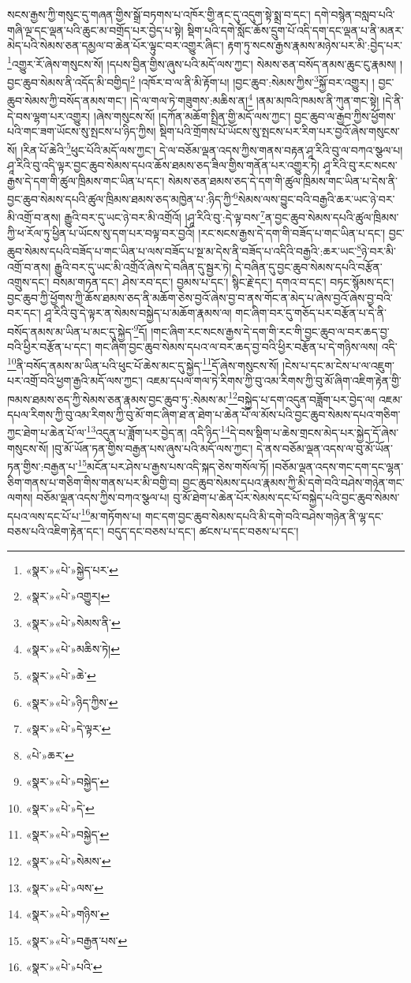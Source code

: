 སངས་རྒྱས་ཀྱི་གསུང་དུ་གཞན་གྱིས་སྒྲོ་བཏགས་པ་འཁོར་གྱི་ནང་དུ་འདུག་སྟེ་སྨྲ་བ་དང་། དགེ་བསྙེན་བསླབ་པའི་གཞི་ལྔ་དང་ལྡན་པའི་ཆུང་མ་བགྲོད་པར་བྱེད་པ་སྟེ། སྡིག་པའི་དགེ་སློང་ཆོས་དྲུག་པོ་འདི་དག་དང་ལྡན་པ་ནི་མནར་མེད་པའི་སེམས་ཅན་དམྱལ་བ་ཆེན་པོར་ལྟུང་བར་འགྱུར་ཞིང་། རྟག་ཏུ་སངས་རྒྱས་རྣམས་མཉེས་པར་མི་:བྱེད་པར་\footnote{«སྣར་»«པེ་»སྐྱེད་པར་}འགྱུར་རོ་ཞེས་གསུངས་སོ། །དཔས་བྱིན་གྱིས་ཞུས་པའི་མདོ་ལས་ཀྱང་། སེམས་ཅན་བསོད་ནམས་ཆུང་ངུ་རྣམས། །བྱང་ཆུབ་སེམས་ནི་འདོད་མི་བགྱིད།\footnote{«སྣར་»«པེ་»འགྱུར།} །འཁོར་བ་ལ་ནི་མི་རྟོག་པ། །བྱང་ཆུབ་:སེམས་ཀྱིས་\footnote{«སྣར་»«པེ་»སེམས་ནི་}སྐྱོ་བར་འགྱུར། །
བྱང་ཆུབ་སེམས་ཀྱི་བསོད་ནམས་གང་། །དེ་ལ་གལ་ཏེ་གཟུགས་:མཆིས་ན།\footnote{«སྣར་»«པེ་»མཆིས་ཏེ།} །ནམ་མཁའི་ཁམས་ནི་ཀུན་གང་སྟེ། །དེ་ནི་དེ་བས་ལྷག་པར་འགྱུར། །ཞེས་གསུངས་སོ། །དཀོན་མཆོག་སྤྲིན་གྱི་མདོ་ལས་ཀྱང་། བྱང་ཆུབ་ལ་རྒྱབ་ཀྱིས་ཕྱོགས་པའི་གང་ཟག་ཡོངས་སུ་སྤངས་པ་ཉིད་ཀྱིས། སྡིག་པའི་གྲོགས་པོ་ཡོངས་སུ་སྤངས་པར་རིག་པར་བྱའོ་ཞེས་གསུངས་སོ། །རིན་པོ་ཆེའི་\footnote{«སྣར་»«པེ་»ཆེ་}ཕུང་པོའི་མདོ་ལས་ཀྱང་། དེ་ལ་བཅོམ་ལྡན་འདས་ཀྱིས་གནས་བརྟན་ཤཱ་རིའི་བུ་ལ་བཀའ་སྩལ་པ། ཤཱ་རིའི་བུ་འདི་ལྟར་བྱང་ཆུབ་སེམས་དཔའ་ཆོས་ཐམས་ཅད་ཟིལ་གྱིས་གནོན་པར་འགྱུར་ཏེ། ཤཱ་རིའི་བུ་རང་སངས་རྒྱས་དེ་དག་གི་ཚུལ་ཁྲིམས་གང་ཡིན་པ་དང་། སེམས་ཅན་ཐམས་ཅད་དེ་དག་གི་ཚུལ་ཁྲིམས་གང་ཡིན་པ་དེས་ནི་བྱང་ཆུབ་སེམས་དཔའི་ཚུལ་ཁྲིམས་ཐམས་ཅད་མཁྱེན་པ་:ཉིད་ཀྱི་\footnote{«སྣར་»«པེ་»ཉིད་ཀྱིས་}སེམས་ལས་བྱུང་བའི་བརྒྱའི་ཆར་ཡང་ཉེ་བར་མི་འགྲོ་བ་ནས། རྒྱུའི་བར་དུ་ཡང་ཉེ་བར་མི་འགྲོའོ། །ཤཱ་རིའི་བུ་:དེ་ལྟ་བས་\footnote{«སྣར་»«པེ་»དེ་ལྟར་}ན་བྱང་ཆུབ་སེམས་དཔའི་ཚུལ་ཁྲིམས་ཀྱི་ཕ་རོལ་ཏུ་ཕྱིན་པ་ཡོངས་སུ་དག་པར་བལྟ་བར་བྱའོ། །རང་སངས་རྒྱས་དེ་དག་གི་བཟོད་པ་གང་ཡིན་པ་དང་། བྱང་ཆུབ་སེམས་དཔའི་བཟོད་པ་གང་ཡིན་པ་ལས་བཟོད་པ་སྔ་མ་དེས་ནི་བཟོད་པ་འདིའི་བརྒྱའི་:ཆར་ཡང་\footnote{«པེ་»ཆར་}ཉེ་བར་མི་འགྲོ་བ་ནས། རྒྱུའི་བར་དུ་ཡང་མི་འགྲོའོ་ཞེས་དེ་བཞིན་དུ་སྦྱར་ཏེ། དེ་བཞིན་དུ་བྱང་ཆུབ་སེམས་དཔའི་བརྩོན་འགྲུས་དང་། བསམ་གཏན་དང་། ཤེས་རབ་དང་། བྱམས་པ་དང་། སྙིང་རྗེ་དང་། དགའ་བ་དང་། བཏང་སྙོམས་དང་། བྱང་ཆུབ་ཀྱི་ཕྱོགས་ཀྱི་ཆོས་ཐམས་ཅད་ནི་མཆོག་ཅེས་བྱའོ་ཞེས་བྱ་བ་ནས་གོང་ན་མེད་པ་ཞེས་བྱའོ་ཞེས་བྱ་བའི་བར་དང་། ཤཱ་རིའི་བུ་དེ་ལྟར་ན་སེམས་བསྐྱེད་པ་མཆོག་རྣམས་ལ། གང་ཞིག་བར་དུ་གཅོད་པར་བརྩོན་པ་དེ་ནི་བསོད་ནམས་མ་ཡིན་པ་མང་དུ་སྐྱེད་\footnote{«སྣར་»«པེ་»བསྐྱེད་}དོ། །གང་ཞིག་རང་སངས་རྒྱས་དེ་དག་གི་རང་གི་བྱང་ཆུབ་ལ་བར་ཆད་བྱ་བའི་ཕྱིར་བརྩོན་པ་དང་། གང་ཞིག་བྱང་ཆུབ་སེམས་དཔའ་ལ་བར་ཆད་བྱ་བའི་ཕྱིར་བརྩོན་པ་དེ་གཉིས་ལས། འདི་\footnote{«སྣར་»«པེ་»དེ་}ནི་བསོད་ནམས་མ་ཡིན་པའི་ཕུང་པོ་ཆེས་མང་དུ་སྐྱེད་\footnote{«སྣར་»«པེ་»བསྐྱེད་}དོ་ཞེས་གསུངས་སོ། །ངེས་པ་དང་མ་ངེས་པ་ལ་འཇུག་པར་འགྲོ་བའི་ཕྱག་རྒྱའི་མདོ་ལས་ཀྱང་། འཇམ་དཔལ་གལ་ཏེ་རིགས་ཀྱི་བུ་འམ་རིགས་ཀྱི་བུ་མོ་ཞིག་འཇིག་རྟེན་གྱི་ཁམས་ཐམས་ཅད་ཀྱི་སེམས་ཅན་རྣམས་བྱང་ཆུབ་ཏུ་:སེམས་མ་\footnote{«སྣར་»«པེ་»སེམས་}བསྐྱེད་པ་དག་འདུན་བཟློག་པར་བྱེད་ལ། འཇམ་དཔལ་རིགས་ཀྱི་བུ་འམ་རིགས་ཀྱི་བུ་མོ་གང་ཞིག་ཐ་ན་ཐེག་པ་ཆེན་པོ་ལ་མོས་པའི་བྱང་ཆུབ་སེམས་དཔའ་གཅིག་ཀྱང་ཐེག་པ་ཆེན་པོ་ལ་\footnote{«སྣར་»«པེ་»ལས་}འདུན་པ་ཟློག་པར་བྱེད་ན། འདི་ཉིད་\footnote{«སྣར་»«པེ་»གཉིས་}དེ་བས་སྡིག་པ་ཆེས་གྲངས་མེད་པར་སྐྱེད་དོ་ཞེས་གསུངས་སོ། །བུ་མོ་ཡོན་ཏན་གྱིས་བརྒྱན་པས་ཞུས་པའི་མདོ་ལས་ཀྱང་། དེ་ནས་བཅོམ་ལྡན་འདས་ལ་བུ་མོ་ཡོན་ཏན་གྱིས་:བརྒྱན་པ་\footnote{«སྣར་»«པེ་»བརྒྱན་པས་}མངོན་པར་ཤེས་པ་རྒྱས་པས་འདི་སྐད་ཅེས་གསོལ་ཏོ། །བཅོམ་ལྡན་འདས་གང་དག་དང་ལྷན་ཅིག་གནས་པ་གཅིག་གིས་གནས་པར་མི་བགྱི་བ། བྱང་ཆུབ་སེམས་དཔའ་རྣམས་ཀྱི་མི་དགེ་བའི་བཤེས་གཉེན་གང་ལགས། བཅོམ་ལྡན་འདས་ཀྱིས་བཀའ་སྩལ་པ། བུ་མོ་ཐེག་པ་ཆེན་པོར་སེམས་དང་པོ་བསྐྱེད་པའི་བྱང་ཆུབ་སེམས་དཔའ་ལས་དང་པོ་པ་\footnote{«སྣར་»«པེ་»པའི་}མ་གཏོགས་པ། གང་དག་བྱང་ཆུབ་སེམས་དཔའི་མི་དགེ་བའི་བཤེས་གཉེན་ནི་ལྷ་དང་བཅས་པའི་འཇིག་རྟེན་དང་། བདུད་དང་བཅས་པ་དང་། ཚངས་པ་དང་བཅས་པ་དང་། 